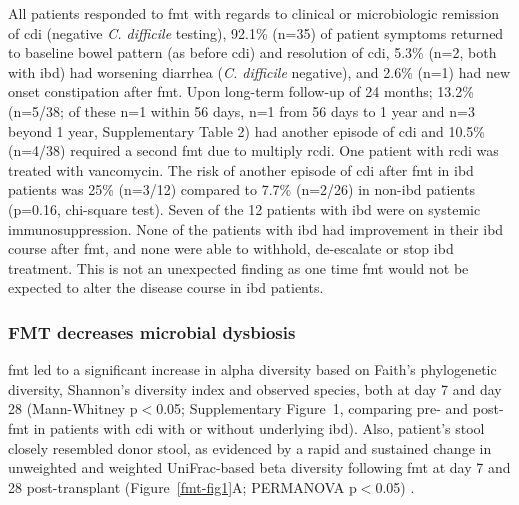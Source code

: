 All patients responded to \gls{fmt} with regards to clinical or microbiologic remission of \gls{cdi} (negative \textit{C. difficile} testing), 92.1\% (n=35) of patient symptoms returned to baseline bowel pattern (as before \gls{cdi}) and resolution of \gls{cdi}, 5.3\% (n=2, both with \gls{ibd}) had worsening diarrhea (\textit{C. difficile} negative), and 2.6\% (n=1) had new onset constipation after \gls{fmt}. Upon long-term follow-up of 24 months; 13.2\% (n=5/38; of these n=1 within 56 days, n=1 from 56 days to 1 year and n=3 beyond 1 year, Supplementary Table 2) had another episode of \gls{cdi} and 10.5\% (n=4/38) required a second \gls{fmt} due to multiply \gls{rcdi}. One patient with \gls{rcdi} was treated with vancomycin. The risk of another episode of \gls{cdi} after \gls{fmt} in \gls{ibd} patients was 25\% (n=3/12) compared to 7.7\% (n=2/26) in non-\gls{ibd} patients (p=0.16, chi-square test). Seven of the 12 patients with \gls{ibd} were on systemic immunosuppression. None of the patients with \gls{ibd} had improvement in their \gls{ibd} course after \gls{fmt}, and none were able to withhold, de-escalate or stop \gls{ibd} treatment. This is not an unexpected finding as one time \gls{fmt} would not be expected to alter the disease course in \gls{ibd} patients.

\subsubsection{FMT decreases microbial dysbiosis}
\gls{fmt} led to a significant increase in alpha diversity based on Faith's phylogenetic diversity, Shannon's diversity index and observed species, both at day 7 and day 28 (Mann-Whitney p$<$0.05; Supplementary Figure~1, comparing pre- and post-\gls{fmt} in patients with \gls{cdi} with or without underlying \gls{ibd}).  Also, patient's stool closely resembled donor stool, as evidenced by a rapid and sustained change in unweighted and weighted UniFrac-based beta diversity following \gls{fmt} at day 7 and 28 post-transplant (Figure~\ref{fmt-fig1}A; PERMANOVA p$<$0.05) \cite{RN1500}. 


